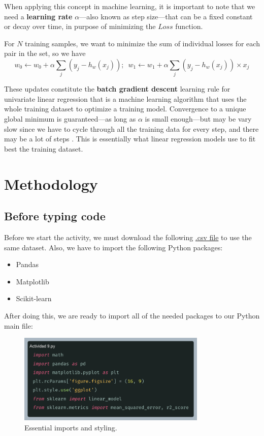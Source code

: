 \documentclass[10pt]{article}
\begin{document}
When applying this concept in machine learning, it is important to note that we need a \textbf{learning rate} $\alpha$---also known as step size---that can be a fixed constant or decay over time, in purpose of minimizing the $Loss$ function. \par

For $N$ training samples, we want to minimize the sum of individual losses for each pair in the set, so we have
\begin{equation*}
    w_{0} \leftarrow w_{0} + \alpha\sum_{j}(y_{j} - h_{w}(x_{j})); \,\,\, w_{1} \leftarrow w_{1} + \alpha\sum_{j}(y_{j} - h_{w}(x_{j})) \times x_{j}
\end{equation*}

These updates constitute the \textbf{batch gradient descent} learning rule for univariate linear regression \cite{ai} that is a machine learning algorithm that uses the whole training dataset to optimize a training model. Convergence to a unique global minimum is guaranteed---as long as $\alpha$ is small enough---but may be vary slow since we have to cycle through all the training data for every step, and there may be a lot of steps \cite{ai}. This is essentially what linear regression models use to fit best the training dataset.

\newpage

\section{Methodology}
\subsection{Before typing code}
Before we start the activity, we must download the following \href{http://www.aprendemachinelearning.com/articulos_ml/}{.csv file} \cite{aprendeML} to use the same dataset. Also, we have to import the following Python packages:
\begin{itemize}
  \item Pandas
  \item Matplotlib
  \item Scikit-learn
\end{itemize}
After doing this, we are ready to import all of the needed packages to our Python main file: \par

\begin{figure}[h]
  \centering
  \includegraphics[width=90mm]{2025-03-26-14-16-48.png}
  \caption{Essential imports and styling.}
\end{figure}
\end{document}
